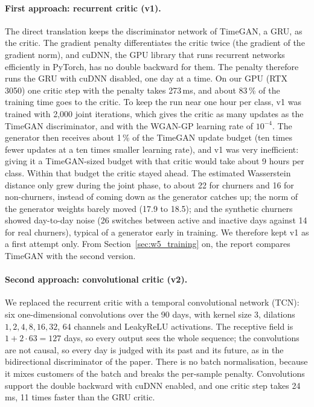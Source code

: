 \documentclass{article}
\begin{document}
\paragraph{First approach: recurrent critic (v1).} The direct translation keeps the discriminator network of TimeGAN, a GRU, as the critic. The gradient penalty differentiates the critic twice (the gradient of the gradient norm), and cuDNN, the GPU library that runs recurrent networks efficiently in PyTorch, has no double backward for them. The penalty therefore runs the GRU with cuDNN disabled, one day at a time. On our GPU (RTX 3050) one critic step with the penalty takes 273\,ms, and about 83\,\% of the training time goes to the critic. To keep the run near one hour per class, v1 was trained with 2{,}000 joint iterations, which gives the critic as many updates as the TimeGAN discriminator, and with the WGAN-GP learning rate of $10^{-4}$. The generator then receives about 1\,\% of the TimeGAN update budget (ten times fewer updates at a ten times smaller learning rate), and v1 was very inefficient: giving it a TimeGAN-sized budget with that critic would take about 9 hours per class. Within that budget the critic stayed ahead. The estimated Wasserstein distance only grew during the joint phase, to about 22 for churners and 16 for non-churners, instead of coming down as the generator catches up; the norm of the generator weights barely moved (17.9 to 18.5); and the synthetic churners showed day-to-day noise (26 switches between active and inactive days against 14 for real churners), typical of a generator early in training. We therefore kept v1 as a first attempt only. From Section~\ref{sec:w5_training} on, the report compares TimeGAN with the second version.

\paragraph{Second approach: convolutional critic (v2).} We replaced the recurrent critic with a temporal convolutional network (TCN): six one-dimensional convolutions over the 90 days, with kernel size 3, dilations $1, 2, 4, 8, 16, 32$, 64 channels and LeakyReLU activations. The receptive field is $1 + 2 \cdot 63 = 127$ days, so every output sees the whole sequence; the convolutions are not causal, so every day is judged with its past and its future, as in the bidirectional discriminator of the paper. There is no batch normalisation, because it mixes customers of the batch and breaks the per-sample penalty. Convolutions support the double backward with cuDNN enabled, and one critic step takes 24\,ms, 11 times faster than the GRU critic.
\end{document}
